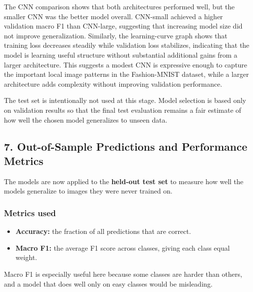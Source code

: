 \documentclass[11pt]{article}
\providecommand{\tightlist}{%
      \setlength{\itemsep}{0pt}\setlength{\parskip}{0pt}}
\begin{document}
    The CNN comparison shows that both architectures performed well, but the
smaller CNN was the better model overall. CNN-small achieved a higher
validation macro F1 than CNN-large, suggesting that increasing model
size did not improve generalization. Similarly, the learning-curve graph
shows that training loss decreases steadily while validation loss
stabilizes, indicating that the model is learning useful structure
without substantial additional gains from a larger architecture. This
suggests a modest CNN is expressive enough to capture the important
local image patterns in the Fashion-MNIST dataset, while a larger
architecture adds complexity without improving validation performance.

The test set is intentionally not used at this stage. Model selection is
based only on validation results so that the final test evaluation
remains a fair estimate of how well the chosen model generalizes to
unseen data.

    \subsection{7. Out-of-Sample Predictions and Performance
Metrics}\label{out-of-sample-predictions-and-performance-metrics}

The models are now applied to the \textbf{held-out test set} to measure
how well the models generalize to images they were never trained on.

\subsubsection{Metrics used}\label{metrics-used}

\begin{itemize}
\tightlist
\item
  \textbf{Accuracy:} the fraction of all predictions that are correct.
\item
  \textbf{Macro F1:} the average F1 score across classes, giving each
  class equal weight.
\end{itemize}

Macro F1 is especially useful here because some classes are harder than
others, and a model that does well only on easy classes would be
misleading.
\end{document}
